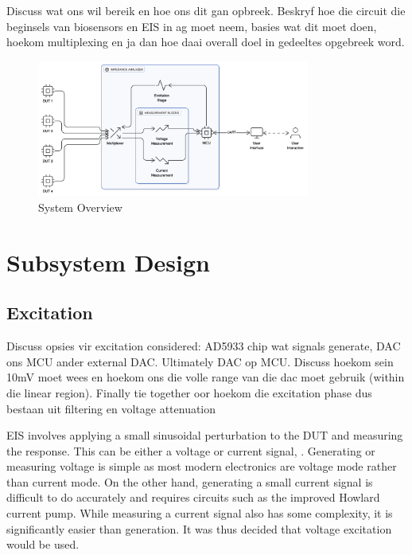 Discuss wat ons wil bereik en hoe ons dit gan opbreek. Beskryf hoe die circuit die beginsels van biosensors en EIS in ag moet neem, basies wat dit moet doen, hoekom multiplexing en ja dan hoe daai overall doel in gedeeltes opgebreek word.

\begin{figure}[H]
    \centering
    \includegraphics[width=0.8\textwidth]{SystemOverview.png}
    \caption{System Overview}
    \label{fig:system_overview} 
\end{figure}

\section{Subsystem Design}

\subsection{Excitation}\label{subsec:design_excitation}
Discuss opsies vir excitation considered: AD5933 chip wat signals generate, DAC ons MCU ander external DAC. Ultimately DAC op MCU.
Discuss hoekom sein 10mV moet wees en hoekom ons die volle range van die dac moet gebruik (within die linear region).
Finally tie together oor hoekom die excitation phase dus bestaan uit filtering en voltage attenuation

EIS involves applying a small sinusoidal perturbation to the \ac{DUT} and measuring the response. This can be either a voltage or current signal, . Generating or measuring voltage is simple as most modern electronics are voltage mode rather than current mode. On the other hand, generating a small current signal is difficult to do accurately and requires circuits such as the improved Howlard current pump. While measuring a current signal also has some complexity, it is significantly easier than generation. It was thus decided that voltage excitation would be used.

